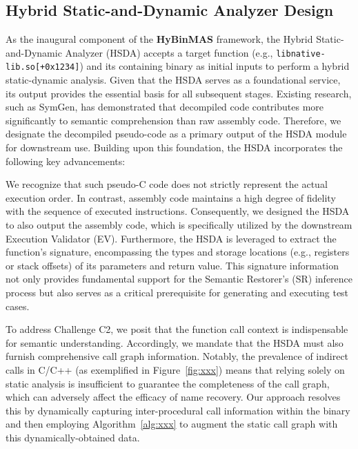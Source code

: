\documentclass[acmsmall,screen,review,anonymous]{acmart} %
\begin{document}
\subsection{Hybrid Static-and-Dynamic Analyzer Design}
\label{sec:hsda_design}

As the inaugural component of the \textbf{HyBinMAS} framework, the Hybrid Static-and-Dynamic Analyzer (HSDA) accepts a target function (e.g., \texttt{libnative-lib.so[+0x1234]}) and its containing binary as initial inputs to perform a hybrid static-dynamic analysis. Given that the HSDA serves as a foundational service, its output provides the essential basis for all subsequent stages. Existing research, such as SymGen, has demonstrated that decompiled code contributes more significantly to semantic comprehension than raw assembly code. Therefore, we designate the decompiled pseudo-code as a primary output of the HSDA module for downstream use. Building upon this foundation, the HSDA incorporates the following key advancements:

We recognize that such pseudo-C code does not strictly represent the actual execution order. In contrast, assembly code maintains a high degree of fidelity with the sequence of executed instructions. Consequently, we designed the HSDA to also output the assembly code, which is specifically utilized by the downstream Execution Validator (EV). Furthermore, the HSDA is leveraged to extract the function's signature, encompassing the types and storage locations (e.g., registers or stack offsets) of its parameters and return value. This signature information not only provides fundamental support for the Semantic Restorer's (SR) inference process but also serves as a critical prerequisite for generating and executing test cases.

To address Challenge C2, we posit that the function call context is indispensable for semantic understanding. Accordingly, we mandate that the HSDA must also furnish comprehensive call graph information. Notably, the prevalence of indirect calls in C/C++ (as exemplified in Figure~\ref{fig:xxx}) means that relying solely on static analysis is insufficient to guarantee the completeness of the call graph, which can adversely affect the efficacy of name recovery. Our approach resolves this by dynamically capturing inter-procedural call information within the binary and then employing Algorithm~\ref{alg:xxx} to augment the static call graph with this dynamically-obtained data.


\end{document}
